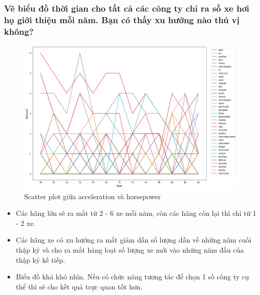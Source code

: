 \documentclass[a4paper, 12pt]{article}
\begin{document}
    \subsubsection{Vẽ biểu đồ thời gian cho tất cả các công ty chỉ ra số xe hơi họ giới thiệu mỗi năm. Bạn có thấy xu hướng nào thú vị không?}
        \begin{figure}[H]
            \centering
                \includegraphics[scale=0.5]{img/timeseries.png}
                \caption{Scatter plot giữa  acceleration và horsepower}
        \end{figure}
        
        \begin{itemize}
            \item Các hãng lớn sẽ ra mắt từ 2 - 6 xe mỗi năm, còn các hãng còn lại thì chỉ từ 1 - 2 xe.
            \item Các hãng xe có xu hướng ra mắt giảm dần số lượng dần về những năm cuối thập kỷ và cho ra mắt hàng loạt số lượng xe mới vào nhứng năm đầu của thập kỷ kế tiếp.
            \item Biểu đồ khá khó nhìn. Nếu có chức năng tương tác để chọn 1 số công ty cụ thể thì sẽ cho kết quả trực quan tốt hơn.
        \end{itemize}
\end{document}

